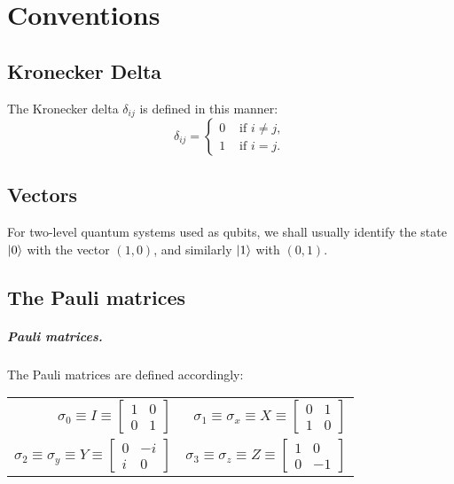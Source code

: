\chapter{Conventions}

\section{Kronecker Delta}

The Kronecker delta $\delta_{ij}$ is defined in this manner: \begin{equation*}
  \delta_{ij} = \begin{cases}
    0 &\text{ if } i \neq j, \\
    1 &\text{ if } i = j.
  \end{cases}
\end{equation*}

\section{Vectors}

For two-level quantum systems used as qubits, we shall usually identify the
state $\ket{0}$ with the vector $(1, 0)$, and similarly $\ket{1}$ with $(0,
1)$.

\section{The Pauli matrices}

\paragraph{Pauli matrices.} The Pauli matrices are defined accordingly:

\begin{center}
  \begin{tabular}{r r}
    \addlinespace[1em]
    $\sigma_0 \equiv I \equiv \begin{bmatrix}
      1 & 0 \\
      0 & 1
    \end{bmatrix}$ & $\sigma_1 \equiv \sigma_x \equiv X \equiv \begin{bmatrix}
      0 & 1 \\
      1 & 0
    \end{bmatrix}$ \\
    \addlinespace[1em]
    $\sigma_2 \equiv \sigma_y \equiv Y \equiv \begin{bmatrix}
      0 & -i \\
      i & 0
    \end{bmatrix}$ & $\sigma_3 \equiv \sigma_z \equiv Z \equiv \begin{bmatrix}
      1 & 0 \\
      0 & -1
    \end{bmatrix}$
  \end{tabular}
\end{center}

